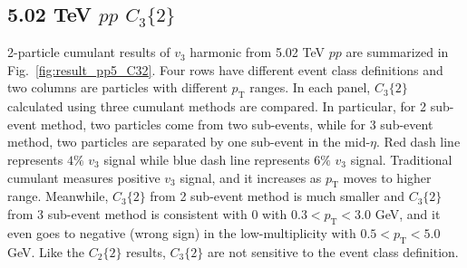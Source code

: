 \subsection{5.02 TeV $pp$ $C_{3}\{2\}$}
2-particle cumulant results of $v_{3}$ harmonic from 5.02 TeV $pp$ are summarized in Fig.~\ref{fig:result_pp5_C32}. Four rows have different event class definitions and two columns are particles with different $p_{\text{T}}$ ranges. In each panel, $C_{3}\{2\}$ calculated using three cumulant methods are compared. In particular, for 2 sub-event method, two particles come from two sub-events, while for 3 sub-event method, two particles are separated by one sub-event in the mid-$\eta$. Red dash line represents $4\%$ $v_{3}$ signal while blue dash line represents $6\%$ $v_{3}$ signal. Traditional cumulant measures positive $v_{3}$ signal, and it increases as $p_{\text{T}}$ moves to higher range. Meanwhile, $C_{3}\{2\}$ from 2 sub-event method is much smaller and $C_{3}\{2\}$ from 3 sub-event method is consistent with 0 with $0.3<p_{\text{T}}<3.0$ GeV, and it even goes to negative (wrong sign) in the low-multiplicity with $0.5<p_{\text{T}}<5.0$ GeV. Like the $C_{2}\{2\}$ results, $C_{3}\{2\}$ are not sensitive to the event class definition.
